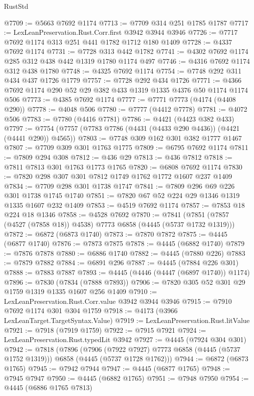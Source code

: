 \begin{lexlean}{RustStd}
\begin{coremodule}
{\begin{coremodule}
{{{{{{{{{{{{{{{{{{{{{{{{{{{{{{{{{{{{{{@7709 := @5663 @7692 @1174
@7713 := @7709 @314 @251 @1785 @1787
@7717 := LexLeanPreservation.Rust.Corr.first @3942 @3944 @3946
@7726 := @7717 @7692 @1174 @313 @251 @441 @1782 @1712 @180 @1409
@7728 := @4337 @7692 @1174
@7731 := @7728 @313 @442 @1782
@7741 := @4302 @7692 @1174 @285 @312 @438 @442 @1319 @1780 @1174 @497
@7746 := @4316 @7692 @1174 @312 @438 @1780
@7748 := @4325 @7692 @1174
@7754 := @7748 @292 @311 @434 @437 @1726 @1779
@7757 := @7728 @292 @434 @1726
@7771 := @4366 @7692 @1174 @290 @52 @29 @382 @433 @1319 @1335 @4376 @50 @1174 @1174 @506
@7773 := @4385 @7692 @1174
@7777 := @7771 @7773 (@4174 (@4408 @290))
@7778 := @4048 @506
@7780 := @7777 (@4412 @7778)
@7781 := @4072 @506
@7783 := @7780 (@4416 @7781)
@7786 := @4421 (@4423 @382 @433)
@7797 := @7754 (@7757 (@7783 @7786 (@4431 (@4433 @290 @4436)) (@4421 (@4441 @290)) @4565))
@7803 := @7748 @309 @162 @301 @382 @1777 @1467
@7807 := @7709 @309 @301 @1763 @1775
@7809 := @6795 @7692 @1174
@7811 := @7809 @294 @308
@7812 := @436 @29
@7813 := @436 @7812
@7818 := @7811 @7813 @301 @1763 @1773 @1765
@7820 := @6808 @7692 @1174
@7830 := @7820 @298 @307 @301 @7812 @1749 @1762 @1772 @1607 @237 @1409
@7834 := @7709 @298 @301 @1738 @1747
@7841 := @7809 @296 @69 @226 @301 @1738 @1745 @1740
@7851 := @7820 @67 @52 @224 @29 @1346 @1319 @1335 @1607 @232 @1409
@7853 := @4519 @7692 @1174
@7857 := @7853 @18 @224 @18 @1346
@7858 := @4528 @7692
@7870 := @7841 (@7851 (@7857 (@4527 (@7858 @18)) @4538) @7773 @6858 (@4445 (@5737 @1732 @1319)))
@7872 := @6872 (@6873 @1740)
@7873 := @7870 @7872
@7875 := @4445 (@6877 @1740)
@7876 := @7873 @7875
@7878 := @4445 (@6882 @1740)
@7879 := @7876 @7878
@7880 := @6886 @1740
@7882 := @4445 (@7880 @226)
@7883 := @7879 @7882
@7884 := @6891 @296
@7887 := @4445 (@7884 @226 @301)
@7888 := @7883 @7887
@7893 := @4445 (@4446 (@4447 (@6897 @1740)) @1174)
@7896 := @7830 (@7834 (@7888 @7893))
@7906 := @7820 @305 @52 @301 @29 @1759 @1319 @1335 @1607 @256 @1409
@7910 := LexLeanPreservation.Rust.Corr.value @3942 @3944 @3946
@7915 := @7910 @7692 @1174 @301 @304 @1759
@7918 := @4173 (@3966 LexLeanTarget.TargetSyntax.Value)
@7919 := LexLeanPreservation.Rust.litValue
@7921 := @7918 (@7919 @1759)
@7922 := @7915 @7921
@7924 := LexLeanPreservation.Rust.typedLit @3942
@7927 := @4445 (@7924 @304 @301)
@7942 := @7818
    (@7896
      (@7906 (@7922 @7927) @7773 @6858 (@4445 (@5737 @1752 @1319)))
      @6858
      (@4445 (@5737 @1728 @1762)))
@7944 := @6872 (@6873 @1765)
@7945 := @7942 @7944
@7947 := @4445 (@6877 @1765)
@7948 := @7945 @7947
@7950 := @4445 (@6882 @1765)
@7951 := @7948 @7950
@7954 := @4445 (@6886 @1765 @7813)
}}}}}}}}}}}}}}}}}}}}}}}}}}}}}}}}}}}}}}
\end{coremodule}}
\end{coremodule}
\end{lexlean}

